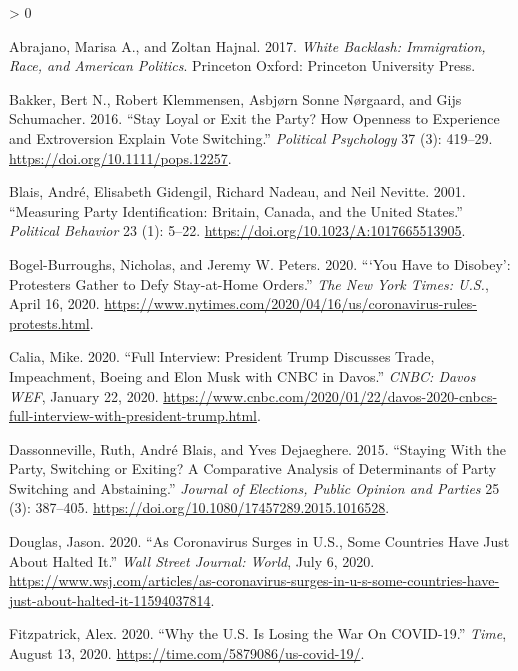 \documentclass[
  12pt,
]{article}
\newlength{\cslhangindent}
\newenvironment{CSLReferences}[2] %
 {%
  \setlength{\parindent}{0pt}
  \ifodd #1 \everypar{\setlength{\hangindent}{\cslhangindent}}\ignorespaces\fi
  \ifnum #2 > 0
  \setlength{\parskip}{#2\baselineskip}
  \fi
 }%
 {}
\begin{document}
\hypertarget{refs}{}
\begin{CSLReferences}{1}{0}
\leavevmode\hypertarget{ref-Abrajano2017}{}%
Abrajano, Marisa A., and Zoltan Hajnal. 2017. \emph{White Backlash: Immigration, Race, and {American} Politics}. {Princeton Oxford}: {Princeton University Press}.

\leavevmode\hypertarget{ref-Bakker2016}{}%
Bakker, Bert N., Robert Klemmensen, Asbjørn Sonne Nørgaard, and Gijs Schumacher. 2016. {``Stay {Loyal} or {Exit} the {Party}? {How Openness} to {Experience} and {Extroversion Explain Vote Switching}.''} \emph{Political Psychology} 37 (3): 419--29. \url{https://doi.org/10.1111/pops.12257}.

\leavevmode\hypertarget{ref-Blais2001}{}%
Blais, André, Elisabeth Gidengil, Richard Nadeau, and Neil Nevitte. 2001. {``Measuring {Party Identification}: {Britain}, {Canada}, and the {United States}.''} \emph{Political Behavior} 23 (1): 5--22. \url{https://doi.org/10.1023/A:1017665513905}.

\leavevmode\hypertarget{ref-Bogel-Burroughs2020}{}%
Bogel-Burroughs, Nicholas, and Jeremy W. Peters. 2020. {``{`{You Have} to {Disobey}'}: {Protesters Gather} to {Defy Stay}-at-{Home Orders}.''} \emph{The New York Times: U.S.}, April 16, 2020. \url{https://www.nytimes.com/2020/04/16/us/coronavirus-rules-protests.html}.

\leavevmode\hypertarget{ref-Calia2020}{}%
Calia, Mike. 2020. {``Full Interview: {President Trump} Discusses Trade, Impeachment, {Boeing} and {Elon Musk} with {CNBC} in {Davos}.''} \emph{CNBC: Davos WEF}, January 22, 2020. \url{https://www.cnbc.com/2020/01/22/davos-2020-cnbcs-full-interview-with-president-trump.html}.

\leavevmode\hypertarget{ref-Dassonneville2015}{}%
Dassonneville, Ruth, André Blais, and Yves Dejaeghere. 2015. {``Staying {With} the {Party}, {Switching} or {Exiting}? {A Comparative Analysis} of {Determinants} of {Party Switching} and {Abstaining}.''} \emph{Journal of Elections, Public Opinion and Parties} 25 (3): 387--405. \url{https://doi.org/10.1080/17457289.2015.1016528}.

\leavevmode\hypertarget{ref-Douglas2020}{}%
Douglas, Jason. 2020. {``As {Coronavirus Surges} in {U}.{S}., {Some Countries Have Just About Halted It}.''} \emph{Wall Street Journal: World}, July 6, 2020. \url{https://www.wsj.com/articles/as-coronavirus-surges-in-u-s-some-countries-have-just-about-halted-it-11594037814}.

\leavevmode\hypertarget{ref-Fitzpatrick2020}{}%
Fitzpatrick, Alex. 2020. {``Why the {U}.{S}. {Is Losing} the {War On COVID}-19.''} \emph{Time}, August 13, 2020. \url{https://time.com/5879086/us-covid-19/}.


\end{CSLReferences}
\end{document}

